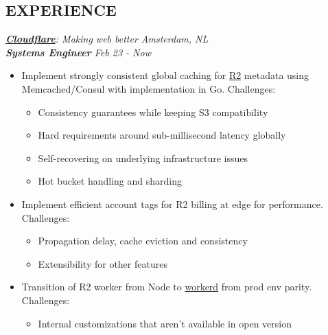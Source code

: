 \documentclass[line, margin]{res}
\begin{document}
\address{\hspace{0.1cm}\href{mailto:elmas.ferhat@gmail.com}{elmas.ferhat@gmail.com}}
\address{\hspace{0.3cm}\href{https://github.com/ferhatelmas}{github.com/ferhatelmas}}

\begin{resume}

\vspace{-0.4cm}

\section{EXPERIENCE}

{\sl \textbf{\href{https://cloudflare.com}{Cloudflare}}: Making web better \hfill Amsterdam, NL} \\
{\sl \textbf{Systems Engineer} \hfill Feb 23 - Now} \\

\vspace{-0.3cm}
\begin{itemize} \itemsep -5pt
	\item{Implement strongly consistent global caching for \href{https://developers.cloudflare.com/r2/}{R2} metadata using Memcached/Consul with implementation in Go. Challenges:}
		\begin{itemize} \itemsep -5pt \small
		\vspace{-.2cm}
		\item Consistency guarantees while keeping S3 compatibility
		\item Hard requirements around sub-millisecond latency globally
		\item Self-recovering on underlying infrastructure issues
		\item Hot bucket handling and sharding
		\end{itemize}

	\item{Implement efficient account tags for R2 billing at edge for performance. Challenges:}
		\begin{itemize} \itemsep -5pt \small
		\vspace{-.2cm}
		\item Propagation delay, cache eviction and consistency
		\item Extensibility for other features
		\end{itemize}

	
	\item{Transition of R2 worker from Node to \href{https://github.com/cloudflare/workerd}{workerd} from prod env parity. Challenges:}
		\begin{itemize} \itemsep -5pt \small
		\vspace{-.2cm}
		\item Internal customizations that aren't available in open version
		\end{itemize}
\end{itemize}


\end{resume}
\end{document}

